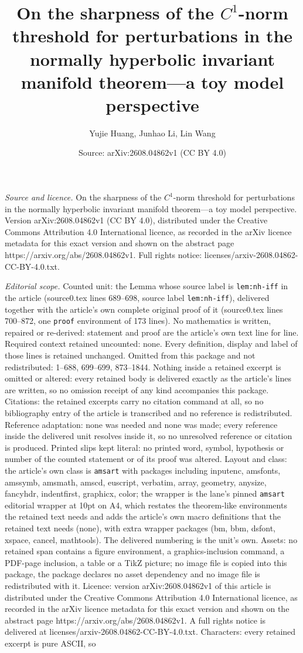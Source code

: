 \documentclass[10pt,a4paper]{amsart}
\title[On the sharpness of the $C^1$-norm threshold for perturbatio]{On the sharpness of the $C^1$-norm threshold for perturbations in the normally hyperbolic invariant manifold theorem---a toy model perspective}
\author{Yujie Huang, Junhao Li, Lin Wang}
\date{Source: arXiv:2608.04862v1 (CC BY 4.0)}
\begin{document}
\maketitle

\noindent\emph{Source and licence.} On the sharpness of the $C^1$-norm threshold for perturbations in the normally hyperbolic invariant manifold theorem---a toy model perspective. Version arXiv:2608.04862v1 (CC BY 4.0), distributed under the Creative Commons Attribution 4.0 International licence, as recorded in the arXiv licence metadata for this exact version and shown on the abstract page https://arxiv.org/abs/2608.04862v1. Full rights notice: licenses/arxiv-2608.04862-CC-BY-4.0.txt.\par\smallskip

\noindent\textit{Editorial scope.} Counted unit: the Lemma whose source label is \texttt{lem:nh-iff} in the article (source0.tex lines 689--698, source label \texttt{lem:nh-iff}), delivered together with the article's own complete original proof of it (source0.tex lines 700--872, one \texttt{proof} environment of 173 lines). No mathematics is written, repaired or re-derived: statement and proof are the article's own text line for line. Required context retained uncounted: none. Every definition, display and label of those lines is retained unchanged. Omitted from this package and not redistributed: 1--688, 699--699, 873--1844. Nothing inside a retained excerpt is omitted or altered: every retained body is delivered exactly as the article's lines are written, so no omission receipt of any kind accompanies this package. Citations: the retained excerpts carry no citation command at all, so no bibliography entry of the article is transcribed and no reference is redistributed. Reference adaptation: none was needed and none was made; every reference inside the delivered unit resolves inside it, so no unresolved reference or citation is produced. Printed slips kept literal: no printed word, symbol, hypothesis or number of the counted statement or of its proof was altered. Layout and class: the article's own class is \texttt{amsart} with packages including inputenc, amsfonts, amssymb, amsmath, amscd, euscript, verbatim, array, geometry, anysize, fancyhdr, indentfirst, graphicx, color; the wrapper is the lane's pinned \texttt{amsart} editorial wrapper at 10pt on A4, which restates the theorem-like environments the retained text needs and adds the article's own macro definitions that the retained text needs (none), with extra wrapper packages (bm, bbm, dsfont, xspace, cancel, mathtools). The delivered numbering is the unit's own. Assets: no retained span contains a figure environment, a graphics-inclusion command, a PDF-page inclusion, a table or a TikZ picture; no image file is copied into this package, the package declares no asset dependency and no image file is redistributed with it. Licence: version arXiv:2608.04862v1 of this article is distributed under the Creative Commons Attribution 4.0 International licence, as recorded in the arXiv licence metadata for this exact version and shown on the abstract page https://arxiv.org/abs/2608.04862v1. A full rights notice is delivered at licenses/arxiv-2608.04862-CC-BY-4.0.txt. Characters: every retained excerpt is pure ASCII, so 
\end{document}
